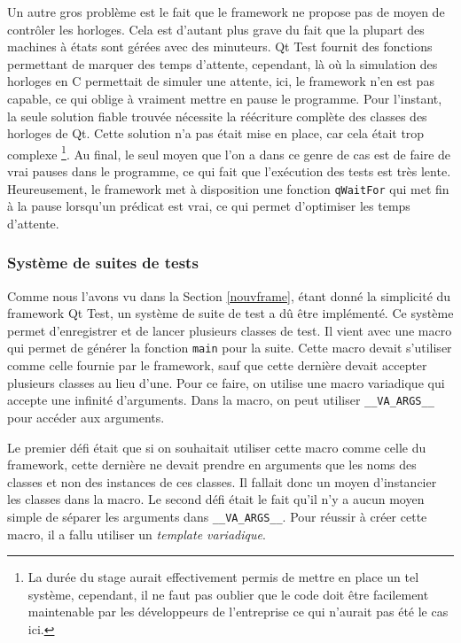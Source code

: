 \documentclass[a4paper]{article}
\begin{document}
Un autre gros problème est le fait que le framework ne propose pas de moyen de
contrôler les horloges. Cela est d'autant plus grave du fait que la plupart des
machines à états sont gérées avec des minuteurs. Qt Test fournit des fonctions
permettant de marquer des temps d'attente, cependant, là où la simulation des
horloges en C permettait de simuler une attente, ici, le framework n'en est pas
capable, ce qui oblige à vraiment mettre en pause le programme. Pour l'instant,
la seule solution fiable trouvée nécessite la réécriture complète des classes
des horloges de Qt. Cette solution n'a pas était mise en place, car cela était
trop complexe \footnote{La durée du stage aurait effectivement permis de mettre
en place un tel système, cependant, il ne faut pas oublier que le code doit être
facilement maintenable par les développeurs de l'entreprise ce qui n'aurait pas
été le cas ici.}. Au final, le seul moyen que l'on a dans ce genre de cas est de
faire de vrai pauses dans le programme, ce qui fait que l'exécution des tests
est très lente. Heureusement, le framework met à disposition une fonction
\verb|qWaitFor| qui met fin à la pause lorsqu'un prédicat est vrai, ce qui
permet d'optimiser les temps d'attente.

\subsubsection*{Système de suites de tests}

Comme nous l'avons vu dans la Section \ref{nouvframe}, étant donné la simplicité
du framework Qt Test, un système de suite de test a dû être implémenté. Ce
système permet d'enregistrer et de lancer plusieurs classes de test. Il vient
avec une macro qui permet de générer la fonction \verb|main| pour la suite.
Cette macro devait s'utiliser comme celle fournie par le framework, sauf que
cette dernière devait accepter plusieurs classes au lieu d'une. Pour ce faire, on
utilise une macro variadique qui accepte une infinité d'arguments. Dans la
macro, on peut utiliser \verb|__VA_ARGS__| pour accéder aux arguments.

Le premier défi était que si on souhaitait utiliser cette macro comme celle du
framework, cette dernière ne devait prendre en arguments que les noms des
classes et non des instances de ces classes. Il fallait donc un moyen
d'instancier les classes dans la macro. Le second défi était le fait qu'il n'y a
aucun moyen simple de séparer les arguments dans \verb|__VA_ARGS__|. Pour
réussir à créer cette macro, il a fallu utiliser un \textit{template
variadique}.
\end{document}
